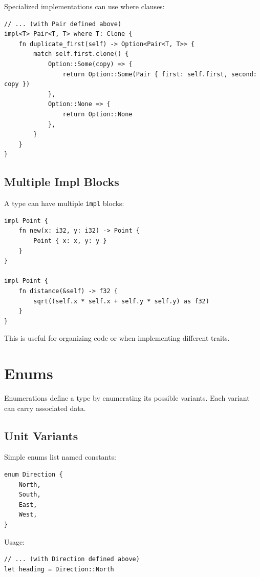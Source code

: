 Specialized implementations can use where clauses:

\begin{lstlisting}
// ... (with Pair defined above)
impl<T> Pair<T, T> where T: Clone {
    fn duplicate_first(self) -> Option<Pair<T, T>> {
        match self.first.clone() {
            Option::Some(copy) => {
                return Option::Some(Pair { first: self.first, second: copy })
            },
            Option::None => {
                return Option::None
            },
        }
    }
}
\end{lstlisting}

\subsection{Multiple Impl Blocks}

A type can have multiple \texttt{impl} blocks:

\begin{lstlisting}
impl Point {
    fn new(x: i32, y: i32) -> Point {
        Point { x: x, y: y }
    }
}

impl Point {
    fn distance(&self) -> f32 {
        sqrt((self.x * self.x + self.y * self.y) as f32)
    }
}
\end{lstlisting}

This is useful for organizing code or when implementing different traits.

\section{Enums}

Enumerations define a type by enumerating its possible variants. Each variant can carry associated data.

\subsection{Unit Variants}

Simple enums list named constants:

\begin{lstlisting}
enum Direction {
    North,
    South,
    East,
    West,
}
\end{lstlisting}

Usage:

\begin{lstlisting}
// ... (with Direction defined above)
let heading = Direction::North
\end{lstlisting}

